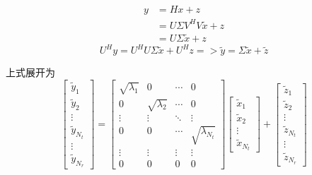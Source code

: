 \documentclass[12pt,a4paper]{ctexart}  %
\begin{document}
\begin{equation}
    \begin{aligned}
    y &= Hx+z \\
    &=U\Sigma V^HV\tilde{x}+z \\ 
    &=U\Sigma\tilde{x}+z
    \end{aligned}
\end{equation}  
\begin{equation}
    U^Hy = U^HU\Sigma\tilde{x}+U^Hz =>
    \tilde{y}=\Sigma\tilde{x}+\tilde{z}
\end{equation} 


上式展开为
\begin{equation}
\left[
    \begin{matrix}
        \tilde{y}_1 \\
        \tilde{y}_2 \\
        \vdots \\
        \tilde{y}_{N_t} \\
        \vdots \\
        \tilde{y}_{N_r}
    \end{matrix}
\right]
=\left[ 
\begin{matrix}
    \sqrt{\lambda_1} & 0 & \cdots & 0 \\
    0 & \sqrt{\lambda_2} & \cdots & 0 \\
    \vdots & \vdots & \ddots & \vdots \\
    0 & 0 & \cdots & \sqrt{\lambda_{N_t}} \\
    \vdots & \vdots & \vdots & \vdots \\
    0 & 0 & 0 & 0
\end{matrix}
\right]
\left[
\begin{matrix}
    \tilde{x}_1 \\
    \tilde{x}_2 \\
    \vdots \\
    \tilde{x}_{N_t}
    \end{matrix}
    \right] + 
    \left[
\begin{matrix}
    \tilde{z}_1 \\
    \tilde{z}_2 \\
    \vdots \\
    \tilde{z}_{N_t} \\
    \vdots \\
    \tilde{z}_{N_r}
\end{matrix}
\right]
\end{equation}
\end{document}
